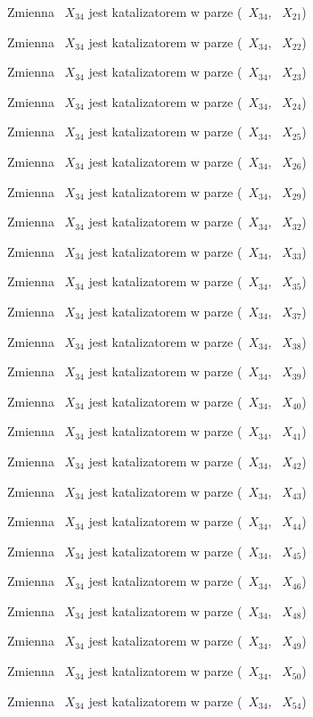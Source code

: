 \documentclass{article}
\begin{document}
Zmienna ~$X_{34}$ jest katalizatorem w parze (~$X_{34}$, ~$X_{21}$)

Zmienna ~$X_{34}$ jest katalizatorem w parze (~$X_{34}$, ~$X_{22}$)

Zmienna ~$X_{34}$ jest katalizatorem w parze (~$X_{34}$, ~$X_{23}$)

Zmienna ~$X_{34}$ jest katalizatorem w parze (~$X_{34}$, ~$X_{24}$)

Zmienna ~$X_{34}$ jest katalizatorem w parze (~$X_{34}$, ~$X_{25}$)

Zmienna ~$X_{34}$ jest katalizatorem w parze (~$X_{34}$, ~$X_{26}$)

Zmienna ~$X_{34}$ jest katalizatorem w parze (~$X_{34}$, ~$X_{29}$)

Zmienna ~$X_{34}$ jest katalizatorem w parze (~$X_{34}$, ~$X_{32}$)

Zmienna ~$X_{34}$ jest katalizatorem w parze (~$X_{34}$, ~$X_{33}$)

Zmienna ~$X_{34}$ jest katalizatorem w parze (~$X_{34}$, ~$X_{35}$)

Zmienna ~$X_{34}$ jest katalizatorem w parze (~$X_{34}$, ~$X_{37}$)

Zmienna ~$X_{34}$ jest katalizatorem w parze (~$X_{34}$, ~$X_{38}$)

Zmienna ~$X_{34}$ jest katalizatorem w parze (~$X_{34}$, ~$X_{39}$)

Zmienna ~$X_{34}$ jest katalizatorem w parze (~$X_{34}$, ~$X_{40}$)

Zmienna ~$X_{34}$ jest katalizatorem w parze (~$X_{34}$, ~$X_{41}$)

Zmienna ~$X_{34}$ jest katalizatorem w parze (~$X_{34}$, ~$X_{42}$)

Zmienna ~$X_{34}$ jest katalizatorem w parze (~$X_{34}$, ~$X_{43}$)

Zmienna ~$X_{34}$ jest katalizatorem w parze (~$X_{34}$, ~$X_{44}$)

Zmienna ~$X_{34}$ jest katalizatorem w parze (~$X_{34}$, ~$X_{45}$)

Zmienna ~$X_{34}$ jest katalizatorem w parze (~$X_{34}$, ~$X_{46}$)

Zmienna ~$X_{34}$ jest katalizatorem w parze (~$X_{34}$, ~$X_{48}$)

Zmienna ~$X_{34}$ jest katalizatorem w parze (~$X_{34}$, ~$X_{49}$)

Zmienna ~$X_{34}$ jest katalizatorem w parze (~$X_{34}$, ~$X_{50}$)

Zmienna ~$X_{34}$ jest katalizatorem w parze (~$X_{34}$, ~$X_{54}$)
\end{document}
